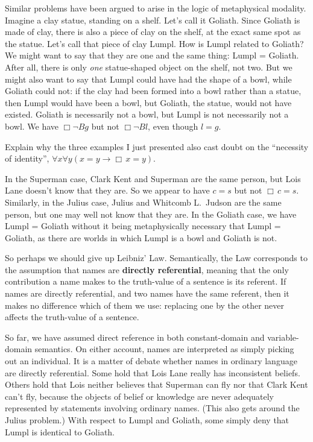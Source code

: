 Similar problems have been argued to arise in the logic of metaphysical
modality. Imagine a clay statue, standing on a shelf. Let's call it
Goliath. Since Goliath is made of clay, there is also a piece of clay on the
shelf, at the exact same spot as the statue. Let's call that piece of clay
Lumpl. How is Lumpl related to Goliath? We might want to say that they are one
and the same thing: Lumpl = Goliath. After all, there is only \emph{one}
statue-shaped object on the shelf, not two. But we might also want to say that
Lumpl could have had the shape of a bowl, while Goliath could not: if the clay
had been formed into a bowl rather than a statue, then Lumpl would have been a
bowl, but Goliath, the statue, would not have existed. Goliath is necessarily
not a bowl, but Lumpl is not necessarily not a bowl. We have $\Box \neg Bg$ but
not $\Box \neg Bl$, even though $l\!=\!g$.

\begin{exercise}
  Explain why the three examples I just presented also cast doubt on the
  ``necessity of identity'', $\forall x\forall y(x\!=\!y \to \Box\, x\!=\!y)$.
\end{exercise}
\begin{solution}
  In the Superman case, Clark Kent and Superman are the same person, but Lois
  Lane doesn't know that they are. So we appear to have $c\!=\!s$ but not
  $\Box\, c\!=\!s$. Similarly, in the Julius case, Julius and Whitcomb L.\ Judson
  are the same person, but one may well not know that they are. In the Goliath
  case, we have Lumpl = Goliath without it being metaphysically necessary that
  Lumpl = Goliath, as there are worlds in which Lumpl is a bowl and Goliath is
  not.
\end{solution}

So perhaps we should give up Leibniz' Law. Semantically, the Law corresponds to
the assumption that names are \textbf{directly referential}, meaning that the
only contribution a name makes to the truth-value of a sentence is its referent.
If names are directly referential, and two names have the same referent, then it
makes no difference which of them we use: replacing one by the other never
affects the truth-value of a sentence.

So far, we have assumed direct reference in both constant-domain and
variable-domain semantics. On either account, names are interpreted as simply
picking out an individual. It is a matter of debate whether names in ordinary
language are directly referential. Some hold that Lois Lane really has
inconsistent beliefs. Others hold that Lois neither believes that Superman can
fly nor that Clark Kent can't fly, because the objects of belief or knowledge
are never adequately represented by statements involving ordinary names. (This
also gets around the Julius problem.) With respect to Lumpl and Goliath, some
simply deny that Lumpl is identical to Goliath.

